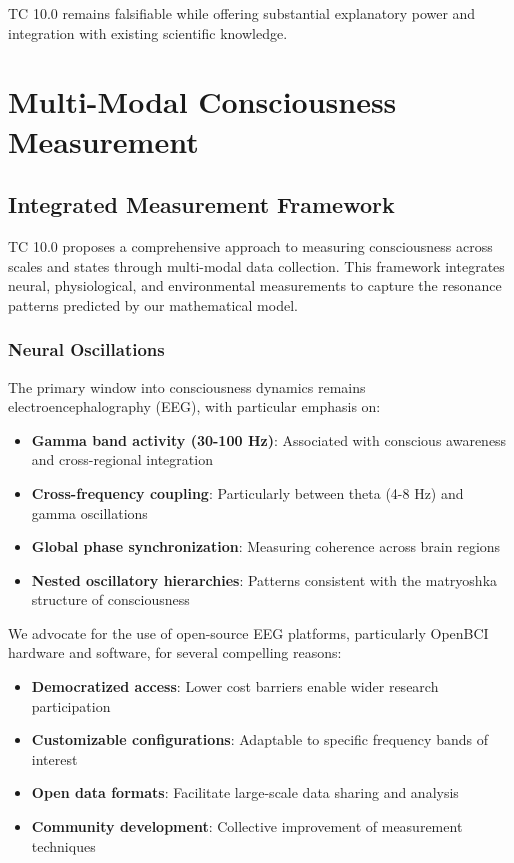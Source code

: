 \documentclass[12pt]{article}
\begin{document}
TC 10.0 remains falsifiable while offering substantial explanatory power and integration with existing scientific knowledge.

\section{Multi-Modal Consciousness Measurement}

\subsection{Integrated Measurement Framework}

TC 10.0 proposes a comprehensive approach to measuring consciousness across scales and states through multi-modal data collection. This framework integrates neural, physiological, and environmental measurements to capture the resonance patterns predicted by our mathematical model.

\subsubsection{Neural Oscillations}

The primary window into consciousness dynamics remains electroencephalography (EEG), with particular emphasis on:

\begin{itemize}
    \item \textbf{Gamma band activity (30-100 Hz)}: Associated with conscious awareness and cross-regional integration
    \item \textbf{Cross-frequency coupling}: Particularly between theta (4-8 Hz) and gamma oscillations
    \item \textbf{Global phase synchronization}: Measuring coherence across brain regions
    \item \textbf{Nested oscillatory hierarchies}: Patterns consistent with the matryoshka structure of consciousness
\end{itemize}

We advocate for the use of open-source EEG platforms, particularly OpenBCI hardware and software, for several compelling reasons:

\begin{itemize}
    \item \textbf{Democratized access}: Lower cost barriers enable wider research participation
    \item \textbf{Customizable configurations}: Adaptable to specific frequency bands of interest
    \item \textbf{Open data formats}: Facilitate large-scale data sharing and analysis
    \item \textbf{Community development}: Collective improvement of measurement techniques
\end{itemize}
\end{document}
